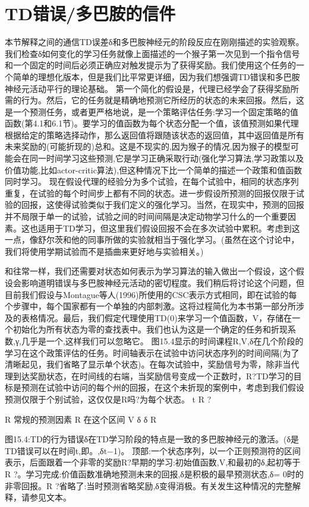 \section{TD错误/多巴胺的信件}
本节解释之间的通信TD误差δ和多巴胺神经元的阶段反应在刚刚描述的实验观察。我们检查δ如何变化的学习任务就像上面描述的一个猴子第一次见到一个指令信号和一个固定的时间后必须正确应对触发提示为了获得奖励。我们使用这个任务的一个简单的理想化版本，但是我们比平常更详细，因为我们想强调TD错误和多巴胺神经元活动平行的理论基础。
第一个简化的假设是，代理已经学会了获得奖励所需的行为。然后，它的任务就是精确地预测它所经历的状态的未来回报。然后，这是一个预测任务，或者更严格地说，是一个策略评估任务:学习一个固定策略的值函数(第4.1和6.1节)。要学习的值函数为每个状态分配一个值，该值预测如果代理根据给定的策略选择动作，那么返回值将跟随该状态的返回值，其中返回值是所有未来奖励的(可能折现的)总和。这是不现实的,因为猴子的情况,因为猴子的模型可能会在同一时间学习这些预测,它是学习正确采取行动(强化学习算法,学习政策以及价值功能,比如actor-critic算法),但这种情况下比一个简单的描述一个政策和值函数同时学习。
现在假设代理的经验分为多个试验，在每个试验中，相同的状态序列重复，在试验的每个时间步上都有不同的状态。进一步假设所预测的回报仅限于试验的回报，这使得试验类似于我们定义的强化学习。当然，在现实中，预测的回报并不局限于单一的试验，试验之间的时间间隔是决定动物学习什么的一个重要因素。这也适用于TD学习，但这里我们假设回报不会在多次试验中累积。考虑到这一点，像舒尔茨和他的同事所做的实验就相当于强化学习。(虽然在这个讨论中，我们将使用学期试验而不是插曲来更好地与实验相关。)

和往常一样，我们还需要对状态如何表示为学习算法的输入做出一个假设，这个假设会影响道明错误与多巴胺神经元活动的密切程度。我们稍后将讨论这个问题，但目前我们假设与Montague等人(1996)所使用的CSC表示方式相同，即在试验的每个步骤中，每个国家都有一个单独的内部刺激。这将过程简化为本书第一部分所涉及的表格情况。最后，我们假定代理使用TD(0)来学习一个值函数，V，存储在一个初始化为所有状态为零的查找表中。我们也认为这是一个确定的任务和折现系数,γ,几乎是一个,这样我们可以忽略它。
图15.4显示的时间课程R,V,δ在几个阶段的学习在这个政策评估的任务。时间轴表示在试验中访问状态序列的时间间隔(为了清晰起见，我们省略了显示单个状态)。在每次试验中，奖励信号为零，除非当代理到达奖励状态，在时间线的右端，当奖励信号变成一个正数时，R?TD学习的目标是预测在试验中访问的每个州的回报，在这个未折现的案例中，考虑到我们假设预测仅限于个别试验，这仅仅是R吗?为每个状态。
		t			R ?
					
	R				
		常规的预测因素	R	在这个区间	
	V				
	δ				
	δ				
R					

图15.4:TD的行为错误δ在TD学习阶段的特点是一致的多巴胺神经元的激活。(δ是TD错误可以在时间t,即。,δt−1)。
顶部:一个状态序列，以一个正则预测符的区间表示，后面跟着一个非零的奖励R?早期的学习:初始值函数,V,和最初的δ,起初等于R ?。学习完成:价值函数准确地预测未来的回报,δ是积极的最早预测状态,δ= 0时的非零回报。R ?省略了:当时预测省略奖励,δ变得消极。有关发生这种情况的完整解释，请参见文本。

